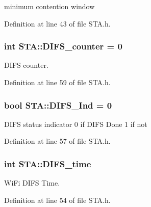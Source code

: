 minimum contention window 



Definition at line 43 of file S\-T\-A.\-h.

\hypertarget{classSTA_a94200f37027c90163adc2cee2c502a90}{
\subsubsection[{D\-I\-F\-S\-\_\-counter}]{\setlength{\rightskip}{0pt plus 5cm}int S\-T\-A\-::\-D\-I\-F\-S\-\_\-counter = 0\hspace{0.3cm}{\ttfamily [private]}}}\label{classSTA_a94200f37027c90163adc2cee2c502a90}


D\-I\-F\-S counter. 



Definition at line 59 of file S\-T\-A.\-h.

\hypertarget{classSTA_a4afbf4650f847e15efbacec896f73f73}{
\subsubsection[{D\-I\-F\-S\-\_\-\-Ind}]{\setlength{\rightskip}{0pt plus 5cm}bool S\-T\-A\-::\-D\-I\-F\-S\-\_\-\-Ind = 0\hspace{0.3cm}{\ttfamily [private]}}}\label{classSTA_a4afbf4650f847e15efbacec896f73f73}
D\-I\-F\-S status indicator 0 if D\-I\-F\-S Done 1 if not 

Definition at line 57 of file S\-T\-A.\-h.

\hypertarget{classSTA_a156a07b07e16882d60b93571b8e3cd21}{
\subsubsection[{D\-I\-F\-S\-\_\-time}]{\setlength{\rightskip}{0pt plus 5cm}int S\-T\-A\-::\-D\-I\-F\-S\-\_\-time\hspace{0.3cm}{\ttfamily [private]}}}\label{classSTA_a156a07b07e16882d60b93571b8e3cd21}


Wi\-Fi D\-I\-F\-S Time. 



Definition at line 54 of file S\-T\-A.\-h.

